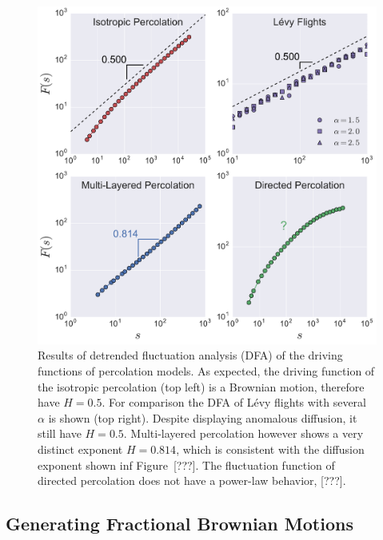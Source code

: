 \begin{figure}
\begin{center}
    \includegraphics[scale=0.45]{chapters/ch6-asle/figs/dfaresults}
\end{center}
\caption{Results of detrended fluctuation analysis (DFA) of the driving
    functions of percolation models. As expected, the driving function of the
    isotropic percolation (top left) is a Brownian motion, therefore have
    $H=0.5$. For comparison the DFA of L\'evy flights with several $\alpha$ is
    shown (top right). Despite displaying anomalous diffusion, it still have
    $H=0.5$. Multi-layered percolation however shows a very distinct exponent
    $H=0.814$, which is consistent with the diffusion exponent shown inf
    Figure~[???]. The fluctuation function of directed percolation does not
    have a power-law behavior, [???].}
\label{fig:dfaresults}
\end{figure}


\subsection{Generating Fractional Brownian Motions}
\label{sec:fbm}

